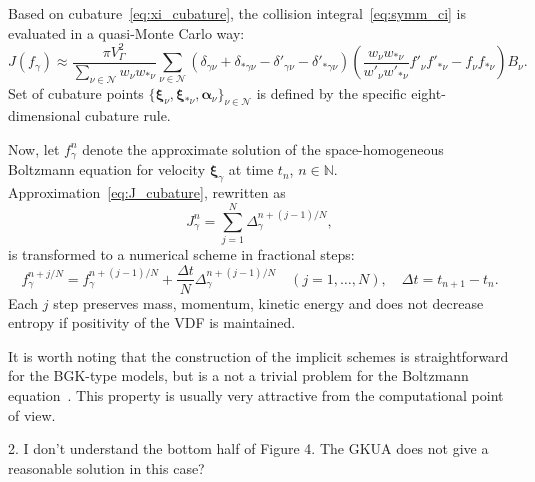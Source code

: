 \documentclass{article}
\def\asterism{\par\vspace{1em}{\centering\scalebox{1}{\bfseries *~*~*}\par}\vspace{.5em}\par}
\newcommand{\bxi}{\boldsymbol{\xi}}
\newcommand{\Nu}{\mathcal{N}}
\begin{document}
\begin{leftbar}
    Based on cubature~\eqref{eq:xi_cubature}, the collision integral~\eqref{eq:symm_ci} is evaluated in a quasi-Monte Carlo way:
    \begin{equation}\label{eq:J_cubature}
        J(f_\gamma) \approx \frac{\pi V_\Gamma^2}{\displaystyle\sum_{\nu\in\Nu} w_{\nu}w_{*\nu}}
            \sum_{\nu\in\Nu} \left(
                \delta_{\gamma\nu} + \delta_{*\gamma\nu} - \delta'_{\gamma\nu} - \delta'_{*\gamma\nu}
            \right)\left(
                \frac{w_{\nu}w_{*\nu}}{w'_{\nu}w'_{*\nu}} f'_{\nu} f'_{*\nu} -  f_{\nu} f_{*\nu}
            \right)B_\nu.
    \end{equation}
    Set of cubature points \(\{\bxi_\nu, \bxi_{*\nu}, \boldsymbol{\alpha}_\nu\}_{\nu\in\Nu}\)
    is defined by the specific eight-dimensional cubature rule.

    \asterism

    Now, let \(f_\gamma^n\) denote the approximate solution of the space-homogeneous Boltzmann equation
    for velocity \(\bxi_\gamma\) at time \(t_n\), \(n\in\mathbb{N}\).
    Approximation~\eqref{eq:J_cubature}, rewritten as
    \begin{equation}\label{eq:J_cubature_short}
        J_\gamma^n = \sum_{j=1}^N \Delta_\gamma^{n+(j-1)/N},
    \end{equation}
    is transformed to a numerical scheme in fractional steps:
    \begin{equation}\label{eq:time_integration_scheme}
         f_\gamma^{n+j/N} =  f_\gamma^{n+(j-1)/N} + \frac{\Delta{t}}{N}\Delta_{\gamma}^{n+(j-1)/N}
        \quad (j = 1,\dotsc,N), \quad \Delta{t} = t_{n+1}-t_n.
    \end{equation}
    Each \(j\) step preserves mass, momentum, kinetic energy and does not decrease entropy
    if positivity of the VDF is maintained.

    \asterism

    It is worth noting that the construction of the implicit schemes is straightforward for the BGK-type models,
    but is a not a trivial problem for the Boltzmann equation~\cite{Aristov1980}.
    This property is usually very attractive from the computational point of view.
\end{leftbar}

\begin{quoting}
    2. I don't understand the bottom half of Figure 4. The GKUA does not give a reasonable solution in this case?
\end{quoting}
\end{document}
